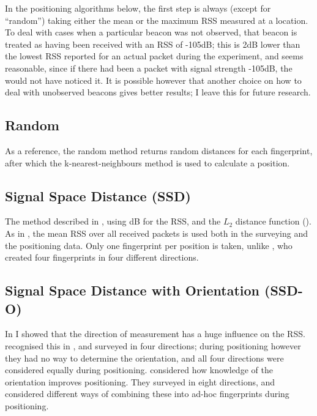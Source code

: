 In the positioning algorithms below, the first step is always (except for ``random'') taking either the mean or the maximum RSS measured at a location.
To deal with cases when a particular beacon was not observed, that beacon is treated as having been received with an RSS of -105dB; this is 2dB lower than the lowest RSS reported for an actual packet during the experiment, and seems reasonable, since if there had been a packet with signal strength -105dB, the \device would not have noticed it.
It is possible however that another choice on how to deal with unobserved beacons gives better results; I leave this for future research.

\subsection{Random}
As a reference, the random method returns random distances for each fingerprint, after which the k-nearest-neighbours method is used to calculate a position.

\subsection{Signal Space Distance (SSD)}
The method described in \citet{bahl2000radar}, using dB for the RSS, and the $L_2$ distance function ().
As in \citet{bahl2000radar}, the mean RSS over all received packets is used both in the surveying and the positioning data.
Only one fingerprint per position is taken, unlike \citet{bahl2000radar}, who created four fingerprints in four different directions.

\subsection{Signal Space Distance with Orientation (SSD-O)}
\label{sec:architecture-ssd-o}
In  I showed that the direction of measurement has a huge influence on the RSS.
\citet{bahl2000radar} recognised this in \wifi, and surveyed in four directions; during positioning however they had no way to determine the orientation, and all four directions were considered equally during positioning.
\citet{king2006compass} considered how knowledge of the orientation improves positioning.
They surveyed in eight directions, and considered different ways of combining these into ad-hoc fingerprints during positioning.


